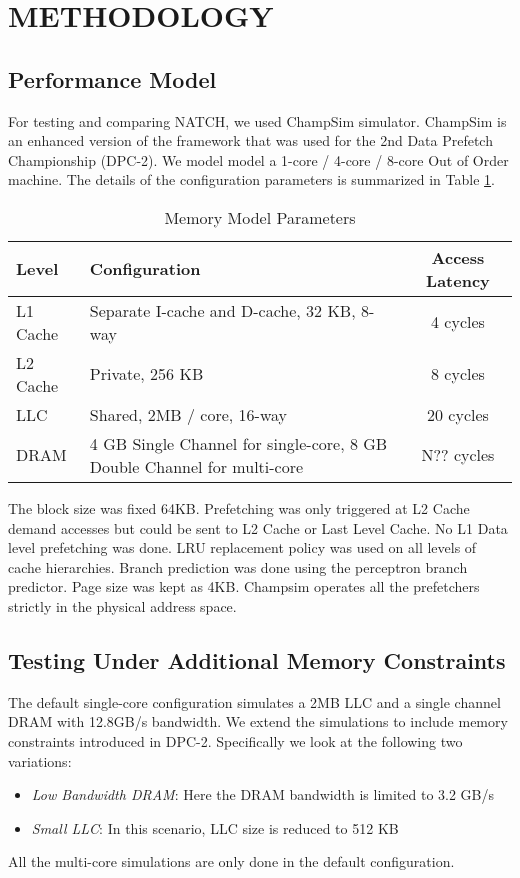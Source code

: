 \section{METHODOLOGY}
\label{Method}

\subsection{Performance Model}
\label{Method-Model}
For testing and comparing NATCH, we used ChampSim\cite{Champsim}
simulator.  ChampSim is an enhanced version of the framework that was
used for the 2nd Data Prefetch Championship (DPC-2).\cite{DPC_2} We
model model a 1-core / 4-core / 8-core Out of Order machine. The
details of the configuration parameters is summarized in Table
\ref{tab:Sim_params}.

\begin{table}[]
    \centering
    \begin{tabular}{|l|p{3.6cm}|c|}
    \hline
    Level & Configuration & Access Latency \\
    \hline
         L1 Cache & Separate I-cache and D-cache, 32 KB, 8-way & 4 cycles\\
         L2 Cache & Private, 256 KB & 8 cycles\\
         LLC & Shared, 2MB / core, 16-way & 20 cycles\\
         DRAM & 4 GB Single Channel for single-core, 8 GB Double Channel for multi-core & N?? cycles\\
    \hline
    \end{tabular}
    \caption{Memory Model Parameters}
    \label{tab:Sim_params}
\end{table}

The block size was fixed 64KB. Prefetching was only triggered at L2
Cache demand accesses but could be sent to L2 Cache or Last Level
Cache.  No L1 Data level prefetching was done.  LRU replacement policy
was used on all levels of cache hierarchies.  Branch prediction was
done using the perceptron branch predictor\cite{Perc_Branch}.  Page
size was kept as 4KB.  Champsim operates all the prefetchers strictly
in the physical address space.

\subsection{Testing Under Additional Memory Constraints}
\label{Method-AdditionalMem}
The default single-core configuration simulates a 2MB LLC and a single
channel DRAM with 12.8GB/s bandwidth.  We extend the simulations to
include memory constraints introduced in DPC-2.  Specifically we look
at the following two variations:
\begin{itemize}
\item \textit{Low Bandwidth DRAM}: Here the DRAM bandwidth is limited
  to 3.2 GB/s
\item \textit{Small LLC}: In this scenario, LLC size is reduced to 512
  KB
\end{itemize}
All the multi-core simulations are only done in the default
configuration.

